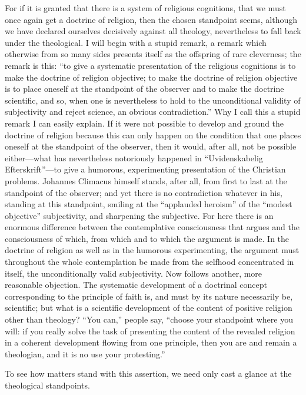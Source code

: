 \documentclass[12pt]{book}
\newcommand{\opage}[1]{\marginnote{\footnotesize\textit{[#1]}}}
\begin{document}
For if it is granted that there is a system of religious cognitions,
that we must once again get a doctrine of religion, then the chosen
standpoint seems, although we have declared ourselves decisively
against all theology, nevertheless to fall back under the theological.
I will begin with a stupid remark, a remark which otherwise from so
many sides presents itself as the offspring of rare cleverness; the
remark is this: ``to give a systematic presentation of the religious
cognitions is to make the doctrine of religion objective; to make the
doctrine of religion objective is to place oneself at the standpoint of
the observer and to make the doctrine scientific, and so, when one is
nevertheless to hold to the unconditional validity of subjectivity and
reject science, an obvious contradiction.'' Why I call this a stupid
remark I can easily explain. If it were not possible to develop and
ground the doctrine of religion because this can only happen on the
condition that one places oneself at the standpoint of the observer,
then it would, after all, not be possible either---what has nevertheless
notoriously happened in ``Uvidenskabelig Efterskrift''---to give a
humorous, experimenting presentation of the Christian problems.
Johannes Climacus himself stands, after all, from first to last at the
standpoint of the observer; and yet there is no contradiction whatever
in his, standing at this standpoint, smiling at the ``applauded
heroism'' of the
\opage{236}\setcounter{footnote}{0}%
``modest objective'' subjectivity, and sharpening the subjective. For
here there is an enormous difference between the contemplative
consciousness that argues and the consciousness of which, from which and
to which the argument is made. In the doctrine of religion as well as in
the humorous experimenting, the argument must throughout the whole
contemplation be made from the selfhood concentrated in itself, the
unconditionally valid subjectivity. Now follows another, more reasonable
objection. The systematic development of a doctrinal concept
corresponding to the principle of faith is, and must by its nature
necessarily be, scientific; but what is a scientific development of the
content of positive religion other than theology? ``You can,'' people
say, ``choose your standpoint where you will: if you really solve the
task of presenting the content of the revealed religion in a coherent
development flowing from one principle, then you are and remain a
theologian, and it is no use your protesting.''

To see how matters stand with this assertion, we need only cast a
glance at the theological standpoints.
\end{document}
